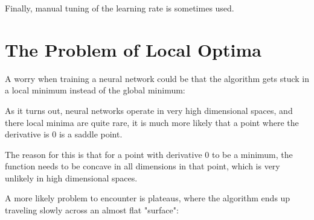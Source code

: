 Finally, manual tuning of the learning rate is sometimes used.






\section{The Problem of Local Optima}

A worry when training a neural network could be that the algorithm gets stuck in a local minimum instead of the global minimum:



As it turns out, neural networks operate in very high dimensional spaces, and there local minima are quite rare, 
it is much more likely that a point where the derivative is $0$ is a saddle point.


The reason for this is that for a point with derivative 0 to be a minimum, the function needs to be concave in all dimensions in that point, which is very unlikely in high dimensional spaces.

A more likely problem to encounter is plateaus, where the algorithm ends up traveling slowly across an almost flat "surface":

